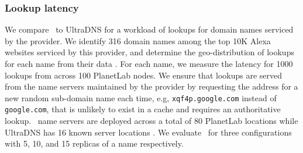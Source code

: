
\subsubsection{Lookup latency}  


We compare \auspice\ to UltraDNS for a workload of lookups for  domain names serviced by the provider. We identify 316 domain names among the top 10K Alexa websites serviced by this provider, and determine
the geo-distribution of lookups for each name from their data \cite{alexa}.
For each name, we measure the latency for 1000 lookups from across 100 PlanetLab nodes. 
We ensure that lookups are served from the name servers maintained by the provider by requesting the address for a new random sub-domain name each time, e.g, \verb+xqf4p.google.com+ instead of \verb+google.com+, that is unlikely to exist in a cache and requires an authoritative lookup.
\auspice\ name servers are deployed across a total of 80 PlanetLab locations while UltraDNS has 16 known server locations \cite{dnscompare}.  
We evaluate \auspice\ for three configurations  with 5, 10, and 15 replicas of a name respectively. 










